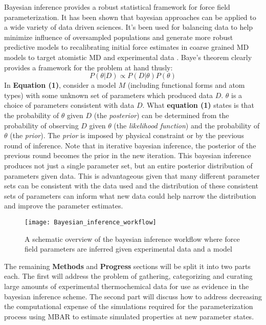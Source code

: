 \documentclass[rmp,nofootinbib,superscriptaddress,12pt,tightenlines,notitlepage]{revtex4-1}
\begin{document}
Bayesian inference provides a robust statistical framework for force field parameterization. It has been shown that 
bayesian approaches can be applied to a wide variety of data driven sciences. It's been used for balancing data to 
help minimize influence of oversampled populations and generate more robust predictive models\cite{bayes_imbalance} 
to recalibrating initial force estimates in coarse grained MD models to target atomistic MD and experimental data
\cite{bayes_coarse}. Baye's theorem clearly provides a framework for the problem at hand thusly:
\begin{equation} P\left(\theta|D\right) \propto P\left(D|\theta\right) P\left(\theta\right)\end{equation}
In \textbf{Equation (1)}, consider a model $M$ (including functional forms and atom types) with some unknown set of 
parameters which produced data $D$. $\theta$ is a choice of parameters consistent with data $D$. What \textbf{equation 
(1)} states is that the probability of $\theta$ given $D$ (the \textit{posterior}) can be determined from the probability 
of observing $D$ given $\theta$ (the \textit{likelihood function}) and the probability of $\theta$ (the \textit{prior}). The 
\textit{prior} is imposed by physical constraint or by the previous round of inference. Note that in 
iterative bayesian inference, the posterior of the previous round becomes the prior in the new iteration. This bayesian 
inference produces not just a single parameter set, but an entire posterior distribution of parameters given data. This is advantageous 
given that many different parameter sets can be consistent with the data used and the distribution of these consistent 
sets of parameters can inform what new data could help narrow the distribution and improve the parameter estimates. 
 \begin{figure}[h!]
  \centering
  \texttt{[image: Bayesian\_inference\_workflow]}
  \caption{A schematic overview of the bayesian inference workflow where force field parameters are inferred given experimental data and a model}
 \end{figure}

The remaining \textbf{Methods} and \textbf{Progress} sections will be split it into two parts each. The first will address the 
problem of gathering, categorizing and curating large amounts of experimental thermochemical data for use as evidence in the 
bayesian inference scheme. The second part will discuss how to address decreasing the computational expense of the simulations
required for the parameterization process using MBAR to estimate simulated properties at new parameter states.  
\end{document}
